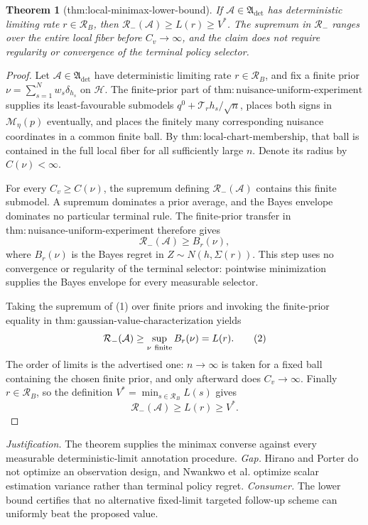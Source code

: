 \documentclass{article}
\newtheorem{theorem}{Theorem}
\begin{document}
\begin{theorem}[thm:local-minimax-lower-bound]\label{thm:local-minimax-lower-bound}
If \(\mathcal A\in\mathfrak A_{\mathrm{det}}\) has deterministic limiting rate \(r\in\mathcal R_B\), then \(\mathcal R_-(\mathcal A)\ge L(r)\ge V^*\). The supremum in \(\mathcal R_-\) ranges over the entire local fiber before \(C_v\to\infty\), and the claim does not require regularity or convergence of the terminal policy selector.
\end{theorem}
\begin{proof}
Let \(\mathcal A\in\mathfrak A_{\mathrm{det}}\) have deterministic limiting rate \(r\in\mathcal R_B\), and fix a finite prior \(\nu=\sum_{s=1}^Nw_s\delta_{h_s}\) on \(\mathcal H\).  The finite-prior part of \(\mathrm{thm:nuisance\text{-}uniform\text{-}experiment}\) supplies its least-favourable submodels \(q^0+\mathcal T_rh_s/\sqrt n\), places both signs in \(\mathcal M_\eta(p)\) eventually, and places the finitely many corresponding nuisance coordinates in a common finite ball.  By \(\mathrm{thm:local\text{-}chart\text{-}membership}\), that ball is contained in the full local fiber for all sufficiently large \(n\).  Denote its radius by \(C(\nu)<\infty\).

For every \(C_v\geq C(\nu)\), the supremum defining \(\mathcal R_-(\mathcal A)\) contains this finite submodel.  A supremum dominates a prior average, and the Bayes envelope dominates no particular terminal rule.  The finite-prior transfer in \(\mathrm{thm:nuisance\text{-}uniform\text{-}experiment}\) therefore gives
\[
 \mathcal R_-(\mathcal A)\geq B_r(\nu),                              \tag{1}
\]
where \(B_r(\nu)\) is the Bayes regret in \(Z\sim N(h,\Sigma(r))\).  This step uses no convergence or regularity of the terminal selector: pointwise minimization supplies the Bayes envelope for every measurable selector.

Taking the supremum of (1) over finite priors and invoking the finite-prior equality in \(\mathrm{thm:gaussian\text{-}value\text{-}characterization}\) yields
\[
 \mathcal R_-(\mathcal A)\geq\sup_{\nu\ {\rm finite}}B_r(\nu)=L(r). \tag{2}
\]
The order of limits is the advertised one: \(n\to\infty\) is taken for a fixed ball containing the chosen finite prior, and only afterward does \(C_v\to\infty\).  Finally \(r\in\mathcal R_B\), so the definition \(V^*=\min_{s\in\mathcal R_B}L(s)\) gives
\[
 \mathcal R_-(\mathcal A)\geq L(r)\geq V^*.
\]
\end{proof}
\par\smallskip\noindent \textit{Justification.} The theorem supplies the minimax converse against every measurable deterministic-limit annotation procedure. \textit{Gap.} Hirano and Porter do not optimize an observation design, and Nwankwo et al. optimize scalar estimation variance rather than terminal policy regret. \textit{Consumer.} The lower bound certifies that no alternative fixed-limit targeted follow-up scheme can uniformly beat the proposed value.
\end{document}
